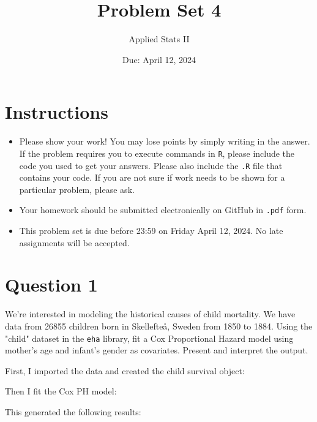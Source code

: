 \documentclass[12pt,letterpaper]{article}
\title{Problem Set 4}
\date{Due: April 12, 2024}
\author{Applied Stats II}
\begin{document}
	\maketitle
	\section*{Instructions}
	\begin{itemize}
	\item Please show your work! You may lose points by simply writing in the answer. If the problem requires you to execute commands in \texttt{R}, please include the code you used to get your answers. Please also include the \texttt{.R} file that contains your code. If you are not sure if work needs to be shown for a particular problem, please ask.
	\item Your homework should be submitted electronically on GitHub in \texttt{.pdf} form.
	\item This problem set is due before 23:59 on Friday April 12, 2024. No late assignments will be accepted.

	\end{itemize}

	\vspace{.25cm}
\section*{Question 1}
\vspace{.25cm}
\noindent We're interested in modeling the historical causes of child mortality. We have data from 26855 children born in Skellefteå, Sweden from 1850 to 1884. Using the "child" dataset in the \texttt{eha} library, fit a Cox Proportional Hazard model using mother's age and infant's gender as covariates. Present and interpret the output.

\vspace{0.5cm}
\noindent First, I imported the data and created the child survival object: 


\vspace{.25cm}

\noindent Then I fit the Cox PH model:


\vspace{.25cm}

\noindent This generated the following results: 
\end{document}

